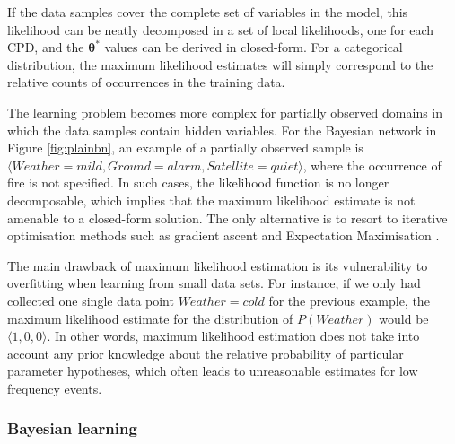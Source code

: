 If the data samples cover the complete set of variables in the model, this likelihood can be neatly decomposed in a set of local likelihoods, one for each CPD, and the $\boldsymbol\theta^*$ values can be derived in closed-form. For a categorical distribution,  the maximum likelihood estimates will simply correspond to the relative counts of occurrences in the training data. 


The learning problem becomes more complex for partially observed domains in which the data samples contain hidden variables.  For the Bayesian network in Figure \ref{fig:plainbn}, an example of a partially observed sample is $\langle \mathit{Weather}\!=\!\mathit{mild}, \mathit{Ground}\!=\!alarm, \mathit{Satellite} \!=\!quiet\rangle$, where the occurrence of fire is not specified.  In such cases, the likelihood function is no longer decomposable, which implies that the maximum likelihood estimate is not amenable to a closed-form solution. The only alternative is to resort to iterative optimisation methods such as gradient ascent \citep{binder1997} and Expectation Maximisation \citep{green1990}. 

The main drawback of maximum likelihood estimation is its vulnerability to overfitting when learning from small data sets. For instance, if we only had collected one single data point $\mathit{Weather}\!=\!\mathit{cold}$ for the previous example, the maximum likelihood estimate for the distribution of $P(\mathit{Weather})$ would be $\langle 1, 0,0\rangle$.  In other words, maximum likelihood estimation does not take into account any prior knowledge about the relative probability of particular parameter hypotheses, which often leads to unreasonable estimates for low frequency events. 

\subsubsection*{Bayesian learning}

